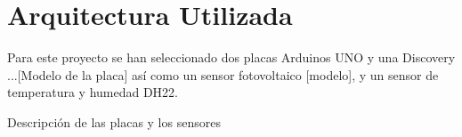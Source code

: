 \section{Arquitectura Utilizada}\label{sec:arquitectura}

Para este proyecto se han seleccionado dos placas Arduinos UNO y una
Discovery ...[Modelo de la placa] así como un sensor fotovoltaico
[modelo], y un sensor de temperatura y humedad DH22.

Descripción de las placas y los sensores

